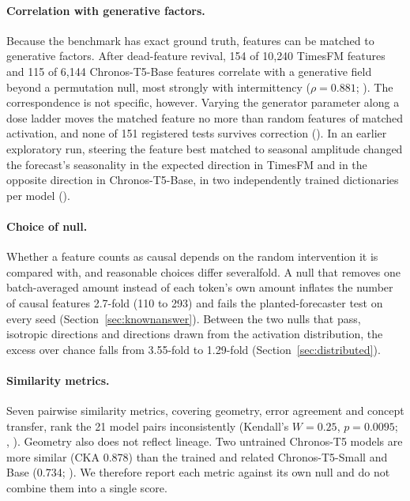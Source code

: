 \paragraph{Correlation with generative factors.} Because the benchmark has exact ground truth, features can be matched
to generative factors. After dead-feature revival, 154 of 10{,}240 TimesFM features and 115 of 6{,}144 Chronos-T5-Base
features correlate with a generative field beyond a permutation null, most strongly with intermittency ($\rho=0.881$;
). The correspondence is not specific, however. Varying the generator parameter along a dose ladder moves the
matched feature no more than random features of matched activation, and none of 151 registered tests survives
correction (). In an earlier exploratory run, steering the feature best matched to seasonal amplitude changed
the forecast's seasonality in the expected direction in TimesFM and in the opposite direction in Chronos-T5-Base, in two
independently trained dictionaries per model ().

\paragraph{Choice of null.} Whether a feature counts as causal depends on the random intervention it is compared with,
and reasonable choices differ severalfold. A null that removes one batch-averaged amount instead of each token's own
amount inflates the number of causal features 2.7-fold (110 to 293) and fails the planted-forecaster test on every seed
(Section~\ref{sec:knownanswer}). Between the two nulls that pass, isotropic directions and directions drawn from the
activation distribution, the excess over chance falls from 3.55-fold to 1.29-fold (Section~\ref{sec:distributed}).

\paragraph{Similarity metrics.} Seven pairwise similarity metrics, covering geometry, error agreement and concept
transfer, rank the 21 model pairs inconsistently (Kendall's $W=0.25$, $p=0.0095$; , ). Geometry
also does not reflect lineage. Two untrained Chronos-T5 models are more similar (CKA 0.878) than the trained and related
Chronos-T5-Small and Base (0.734; ). We therefore report each metric against its own null and do not combine
them into a single score.
